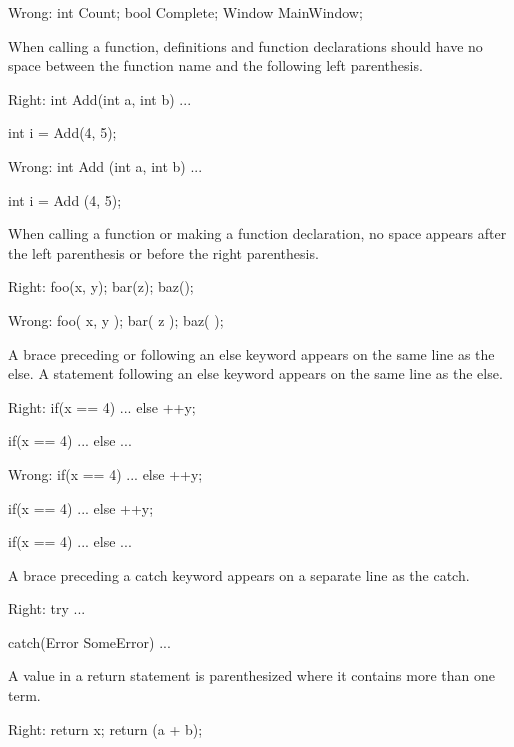 Wrong:
\startCodeExample
\starttyping
int Count;
bool Complete;
Window MainWindow;
\stoptyping
\stopCodeExample

\item
When calling a function, definitions and function declarations should have no space between the function name and the following left parenthesis.

Right:
\startCodeExample
\starttyping
int Add(int a, int b)
{ 
    ... 
}

int i = Add(4, 5);
\stoptyping
\stopCodeExample

Wrong:
\startCodeExample
\starttyping
int Add (int a, int b)
{
    ...
}

int i = Add (4, 5);
\stoptyping
\stopCodeExample

\item
When calling a function or making a function declaration, no space appears after the left parenthesis or before the right parenthesis.

Right:
\startCodeExample
\starttyping
foo(x, y);
bar(z);
baz();
\stoptyping
\stopCodeExample

Wrong:
\startCodeExample
\starttyping
foo( x, y );
bar( z );
baz( );
\stoptyping
\stopCodeExample

\item
A brace preceding or following an else keyword appears on the same line as the else. A statement following an else keyword appears on the same line as the else. 

Right:
\startCodeExample
\starttyping
if(x == 4)
{
    ...
}
else
  ++y;

if(x == 4)
{
    ...
}
else
{
    ...
}
\stoptyping
\stopCodeExample

Wrong:
\startCodeExample
\starttyping
if(x == 4) {
    ...
}
else ++y;

if(x == 4) {
    ...
} else ++y;

if(x == 4) {
    ...
}
else {
    ...
}
\stoptyping
\stopCodeExample

\item
A brace preceding a catch keyword appears on a separate line as the catch. 

Right:
\startCodeExample
\starttyping
try
{
    ...
}

catch(Error SomeError)
{
    ...
}
\stoptyping
\stopCodeExample

\item
A value in a return statement is parenthesized where it contains more than one term.

Right:
\startCodeExample
\starttyping
return x;
return (a + b);
\stoptyping
\stopCodeExample

